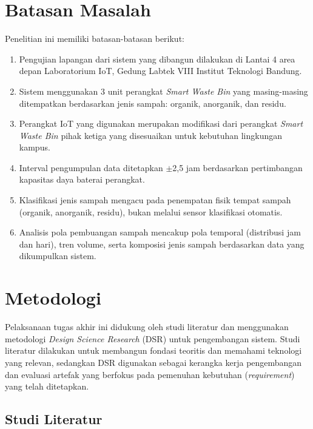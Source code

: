\section{Batasan Masalah}

Penelitian ini memiliki batasan-batasan berikut:

\begin{enumerate}
    \item Pengujian lapangan dari sistem yang dibangun dilakukan di Lantai 4 area depan Laboratorium IoT, Gedung Labtek VIII Institut Teknologi Bandung.

    \item Sistem menggunakan 3 unit perangkat \textit{Smart Waste Bin} yang masing-masing ditempatkan berdasarkan jenis sampah: organik, anorganik, dan residu.

    \item Perangkat IoT yang digunakan merupakan modifikasi dari perangkat \textit{Smart Waste Bin} pihak ketiga yang disesuaikan untuk kebutuhan lingkungan kampus.

    \item Interval pengumpulan data ditetapkan $\pm$2,5 jam berdasarkan pertimbangan kapasitas daya baterai perangkat.

    \item Klasifikasi jenis sampah mengacu pada penempatan fisik tempat sampah (organik, anorganik, residu), bukan melalui sensor klasifikasi otomatis.

    \item Analisis pola pembuangan sampah mencakup pola temporal (distribusi jam dan hari), tren volume, serta komposisi jenis sampah berdasarkan data yang dikumpulkan sistem.
\end{enumerate}

\section{Metodologi}

Pelaksanaan tugas akhir ini didukung oleh studi literatur dan menggunakan metodologi \textit{Design Science Research} (DSR) untuk pengembangan sistem. Studi literatur dilakukan untuk membangun fondasi teoritis dan memahami teknologi yang relevan, sedangkan DSR digunakan sebagai kerangka kerja pengembangan dan evaluasi artefak yang berfokus pada pemenuhan kebutuhan (\textit{requirement}) yang telah ditetapkan.

\subsection{Studi Literatur}

